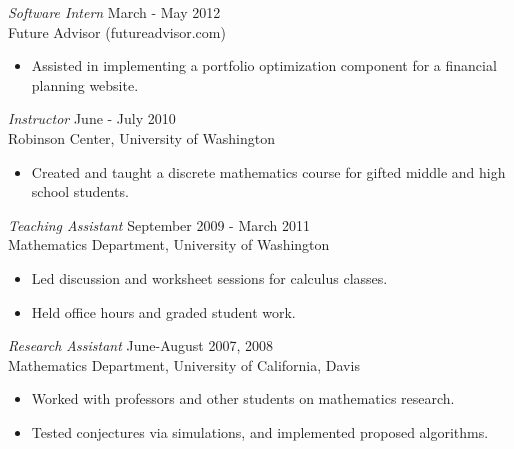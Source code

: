 \documentclass{res}
\begin{document}
\begin{resume}
                {\sl Software Intern} \hfill            March - May 2012\\
                Future Advisor (futureadvisor.com)
                 \begin{itemize}  \itemsep -2pt %
                 \item Assisted in implementing a portfolio optimization component for a financial planning website.
                 \end{itemize} 
                {\sl Instructor} \hfill            June - July 2010\\
                Robinson Center, University of Washington
                 \begin{itemize}  \itemsep -2pt %
                 \item Created and taught a discrete mathematics course for gifted middle and high school students.
                 \end{itemize} 
                {\sl Teaching Assistant} \hfill            September 2009 - March 2011\\
                Mathematics Department, University of Washington
                 \begin{itemize}  \itemsep -2pt %
                 \item Led discussion and worksheet sessions for calculus classes.
		\item Held office hours and graded student work.
		\end{itemize}
                {\sl Research Assistant} \hfill            June-August 2007, 2008\\
                Mathematics Department, University of California, Davis
                 \begin{itemize}  \itemsep -2pt %
                 \item Worked with professors and other students on mathematics research.
		\item Tested conjectures via simulations, and implemented proposed algorithms.
                 \end{itemize} 



\end{resume}
\end{document}
